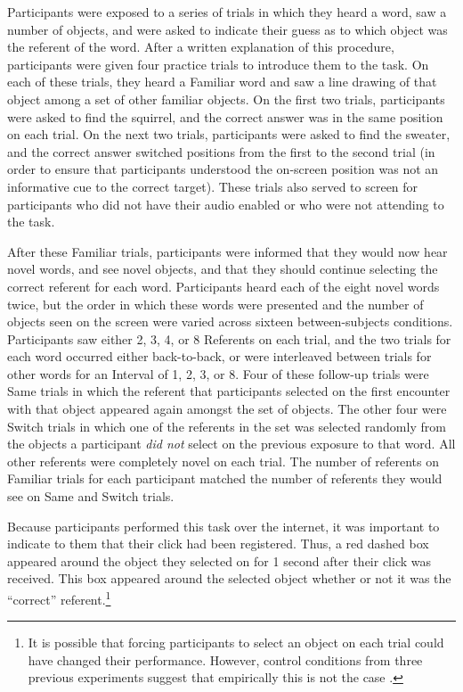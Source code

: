 \documentclass[man,floatsintext]{apa6}
\begin{document}
Participants were exposed to a series of trials in which they heard a word, saw a number of objects, and were asked to indicate their guess as to which object was the referent of the word. After a written explanation of this procedure, participants were given four practice trials to introduce them to the task. On each of these trials, they heard a Familiar word and saw a line drawing of that object among a set of other familiar objects. On the first two trials, participants were asked to find the squirrel, and the correct answer was in the same position on each trial. On the next two trials, participants were asked to find the sweater, and the correct answer switched positions from the first to the second trial (in order to ensure that participants understood the on-screen position was not an informative cue to the correct target). These trials also served to screen for participants who did not have their audio enabled or who were not attending to the task.

After these Familiar trials, participants were informed that they would now hear novel words, and see novel objects, and that they should continue selecting the correct referent for each word. Participants heard each of the eight novel words twice, but the order in which these words were presented and the number of objects seen on the screen were varied across sixteen between-subjects conditions. Participants saw either 2, 3, 4, or 8 Referents on each trial, and the two trials for each word occurred either back-to-back, or were interleaved between trials for other words for an Interval of 1, 2, 3, or 8. Four of these follow-up trials were Same trials in which the referent that participants selected on the first encounter with that object appeared again amongst the set of objects. The other four were Switch trials in which one of the referents in the set was selected randomly from the objects a participant \emph{did not} select on the previous exposure to that word. All other referents were completely novel on each trial. The number of referents on Familiar trials for each participant matched the number of referents they would see on Same and Switch trials.

Because participants performed this task over the internet, it was important to indicate to them that their click had been registered. Thus, a red dashed box appeared around the object they selected on for 1 second after their click was received. This box appeared around the selected object whether or not it was the ``correct'' referent.\footnote{It is possible that forcing participants to select an object on each trial could have changed their performance. However, control conditions from three previous experiments suggest that empirically this is not the case \cite{Medina2011, Smith2011a, Trueswell2013}.}
\end{document}
